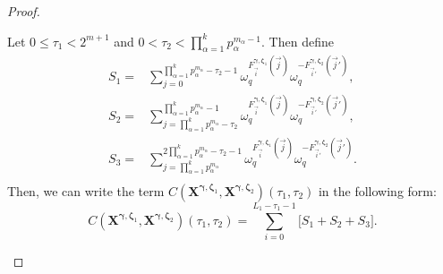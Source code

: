 \documentclass[pdflatex,sn-mathphys-num]{sn-jnl}%
\theoremstyle{thmstyleone}
\begin{document}
\begin{proof}
		\begin{mycases}
			\item Let  $0 \leq \tau_1 < 2^{m+1}$ and $0 < \tau_2 < \prod_{\alpha=1}^{k} p_\alpha^{m_\alpha-1}$. Then define
			\begin{equation}
				\begin{split}
					S_1=&  \sum_{j=0}^{\prod_{\alpha=1}^{k} p_\alpha^{m_\alpha} -\tau_2-1} \omega_q^{ 	F_{ \vec{i}}^{\bm{\gamma}, \bm{\zeta}_1} (\vec{j}) } \omega_q^{ 	-F_{ \vec{i}'}^{\bm{\gamma}, \bm{\zeta}_2} (\vec{j}') },\\
					S_2=& \sum_{j= \prod_{\alpha=1}^{k} p_\alpha^{m_\alpha} -\tau_2 }^{\prod_{\alpha=1}^{k}  p_\alpha^{m_\alpha}-1} \omega_q^{ 	F_{ \vec{i}}^{\bm{\gamma}, \bm{\zeta}_1} (\vec{j}) } \omega_q^{ 	-F_{ \vec{i}'}^{\bm{\gamma}, \bm{\zeta}_2} (\vec{j}') },\\
					S_3=& \sum_{j= \prod_{\alpha=1}^{k} p_\alpha^{m_\alpha}}^{2 \prod_{\alpha=1}^{k} p_\alpha^{m_\alpha} -\tau_2-1} \omega_q^{ 	F_{ \vec{i}}^{\bm{\gamma}, \bm{\zeta}_1} (\vec{j}) } \omega_q^{ 	-F_{ \vec{i}'}^{\bm{\gamma}, \bm{\zeta}_2} (\vec{j}') }.\\
				\end{split}
			\end{equation}
			Then, we can write the term $ C\left( \mathbf{X}^{\bm{\gamma},\bm{\zeta}_1}, \mathbf{X}^{\bm{\gamma}, \bm{\zeta}_2} \right) (\tau_1, \tau_2)$ in the following form:
			\begin{equation}\label{eqn_S_sum}
				C\left( \mathbf{X}^{\bm{\gamma},\bm{\zeta}_1}, \mathbf{X}^{\bm{\gamma}, \bm{\zeta}_2} \right) (\tau_1, \tau_2)= \sum_{i=0}^{L_1 -\tau_1-1} \bigg[ S_1 + S_2+ S_3 \bigg].
			\end{equation}
			

\end{mycases}
\end{proof}
\end{document}
